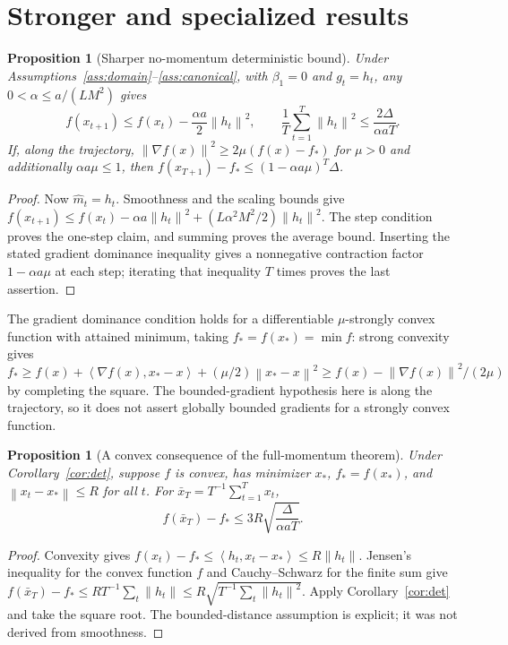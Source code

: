 \documentclass[11pt]{article}
\newtheorem{proposition}[theorem]{Proposition}
\theoremstyle{definition}
\theoremstyle{remark}
\newcommand{\norm}[1]{\left\lVert#1\right\rVert}
\newcommand{\ip}[2]{\left\langle#1,#2\right\rangle}
\begin{document}
\section{Stronger and specialized results}\label{sec:special}
\begin{proposition}[Sharper no-momentum deterministic bound]\label{prop:nomomentum}
Under Assumptions~\ref{ass:domain}--\ref{ass:canonical}, with $\beta_1=0$
and $g_t=h_t$, any $0<\alpha\le a/(LM^2)$ gives
\[
 f(x_{t+1})\le f(x_t)-\frac{\alpha a}{2}\norm{h_t}^2,\qquad
 \frac1T\sum_{t=1}^T\norm{h_t}^2\le\frac{2\Delta}{\alpha aT}.
\]
If, along the trajectory, $\norm{\nabla f(x)}^2\ge2\mu(f(x)-f_*)$ for
$\mu>0$ and additionally $\alpha a\mu\le1$, then
$f(x_{T+1})-f_*\le(1-\alpha a\mu)^T\Delta$.
\end{proposition}
\begin{proof}
Now $\widehat m_t=h_t$. Smoothness and the scaling bounds give
$f(x_{t+1})\le f(x_t)-\alpha a\norm{h_t}^2+
(L\alpha^2M^2/2)\norm{h_t}^2$. The step condition proves the one-step claim,
and summing proves the average bound. Inserting the stated gradient dominance
inequality gives a nonnegative contraction factor $1-\alpha a\mu$ at each
step; iterating that inequality $T$ times proves the last assertion.
\end{proof}
The gradient dominance condition holds for a differentiable
$\mu$-strongly convex function with attained minimum, taking
$f_*=f(x_*)=\min f$: strong convexity gives
$f_*\ge f(x)+\ip{\nabla f(x)}{x_*-x}+(\mu/2)\norm{x_*-x}^2
\ge f(x)-\norm{\nabla f(x)}^2/(2\mu)$ by completing the square.
The bounded-gradient hypothesis here is along the trajectory, so it does not
assert globally bounded gradients for a strongly convex function.

\begin{proposition}[A convex consequence of the full-momentum theorem]
Under Corollary~\ref{cor:det}, suppose $f$ is convex, has minimizer $x_*$,
$f_*=f(x_*)$, and $\norm{x_t-x_*}\le R$ for all $t$. For
$\bar x_T=T^{-1}\sum_{t=1}^T x_t$,
\[
 f(\bar x_T)-f_*\le3R\sqrt{\frac{\Delta}{\alpha aT}}.
\]
\end{proposition}
\begin{proof}
Convexity gives $f(x_t)-f_*\le\ip{h_t}{x_t-x_*}\le R\norm{h_t}$.
Jensen's inequality for the convex function $f$ and Cauchy--Schwarz for the
finite sum give
$f(\bar x_T)-f_*\le R T^{-1}\sum_t\norm{h_t}
\le R\sqrt{T^{-1}\sum_t\norm{h_t}^2}$.
Apply Corollary~\ref{cor:det} and take the square root.
The bounded-distance assumption is explicit; it was not derived from smoothness.
\end{proof}
\end{document}

